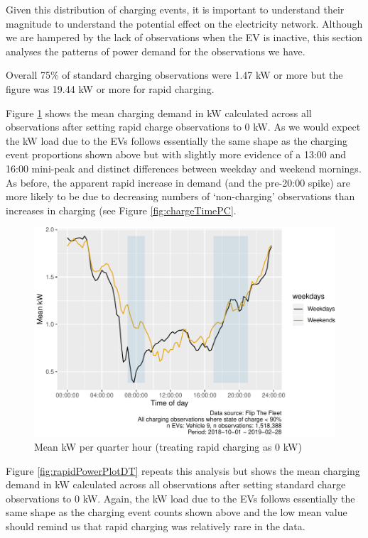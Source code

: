 \documentclass[]{article}
\begin{document}
Given this distribution of charging events, it is important to understand their magnitude to understand the potential effect on the electricity network. Although we are hampered by the lack of observations when the EV is inactive, this section analyses the patterns of power demand for the observations we have.

Overall 75\% of standard charging observations were 1.47 kW or more but the figure was 19.44 kW or more for rapid charging.

Figure \ref{fig:nonRapidPowerPlotDT} shows the mean charging demand in kW calculated across all observations after setting rapid charge observations to 0 kW. As we would expect the kW load due to the EVs follows essentially the same shape as the charging event proportions shown above but with slightly more evidence of a 13:00 and 16:00 mini-peak and distinct differences between weekday and weekend mornings. As before, the apparent rapid increase in demand (and the pre-20:00 spike) are more likely to be due to decreasing numbers of `non-charging' observations than increases in charging (see Figure \ref{fig:chargeTimePC}.

\begin{figure}
\centering
\includegraphics{EVBB_report_v1_files/figure-latex/nonRapidPowerPlotDT-1.pdf}
\caption{\label{fig:nonRapidPowerPlotDT}Mean kW per quarter hour (treating rapid charging as 0 kW)}
\end{figure}

Figure \ref{fig:rapidPowerPlotDT} repeats this analysis but shows the mean charging demand in kW calculated across all observations after setting standard charge observations to 0 kW. Again, the kW load due to the EVs follows essentially the same shape as the charging event counts shown above and the low mean value should remind us that rapid charging was relatively rare in the data.
\end{document}
